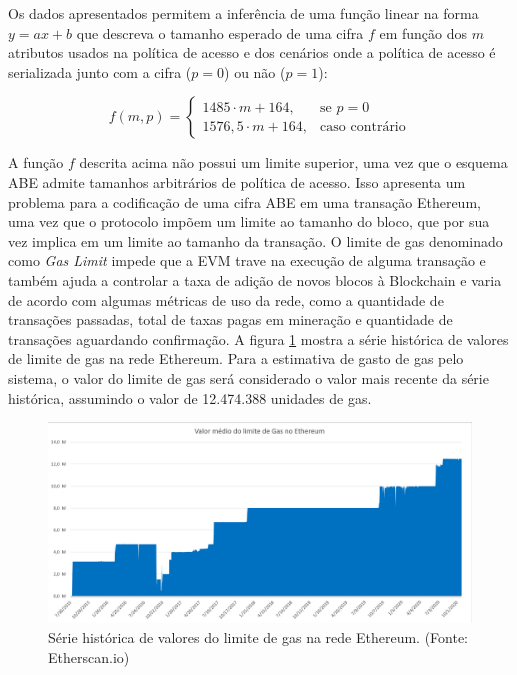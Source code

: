 \documentclass[a4paper,11pt]{article}
\begin{document}
Os dados apresentados permitem a inferência de uma função linear na forma $y = ax + b$ que descreva o tamanho esperado de uma cifra $f$ em função dos $m$ atributos usados na política de acesso e dos cenários onde a política de acesso é serializada junto com a cifra ($p = 0$) ou não ($p = 1$):

\[ f(m, p) =
\left\{\begin{matrix}
    1485 \cdot m + 164, & \mbox{se }p = 0 \\
    1576{,}5 \cdot m + 164, & \mbox{caso contrário}
\end{matrix} \right. \]

A função $f$ descrita acima não possui um limite superior, uma vez que o esquema ABE admite tamanhos arbitrários de política de acesso.
Isso apresenta um problema para a codificação de uma cifra ABE em uma transação Ethereum, uma vez que o protocolo impõem um limite ao tamanho do bloco, que por sua vez implica em um limite ao tamanho da transação.
O limite de gas denominado como \emph{Gas Limit} impede que a EVM trave na execução de alguma transação e também ajuda a controlar a taxa de adição de novos blocos à Blockchain e varia de acordo com algumas métricas de uso da rede, como a quantidade de transações passadas, total de taxas pagas em mineração e quantidade de transações aguardando confirmação.
A figura \ref{fig:serie-gasLimit} mostra a série histórica de valores de limite de gas na rede Ethereum.
Para a estimativa de gasto de gas pelo sistema, o valor do limite de gas será considerado o valor mais recente da série histórica, assumindo o valor de 12.474.388 unidades de gas.

\begin{figure}[!h]
  \centering
  \includegraphics[width=\textwidth]{images/gasLimit.png}
  \caption{Série histórica de valores do limite de gas na rede Ethereum. (Fonte: Etherscan.io)}
  \label{fig:serie-gasLimit}
\end{figure}
\end{document}
